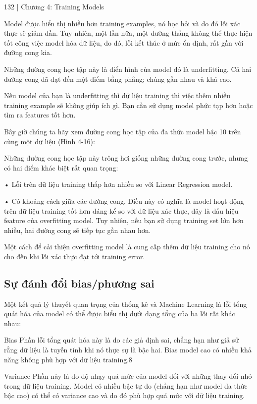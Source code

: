 132 | Chương 4: Training Models

Model được hiển thị nhiều hơn training examples, nó học hỏi và do đó lỗi xác thực sẽ giảm dần. Tuy nhiên, một lần nữa, một đường thẳng không thể thực hiện tốt công việc model hóa dữ liệu, do đó, lỗi kết thúc ở mức ổn định, rất gần với đường cong kia.

Những đường cong học tập này là điển hình của model đó là underfitting. Cả hai đường cong đã đạt đến một điểm bằng phẳng; chúng gần nhau và khá cao.

Nếu model của bạn là underfitting thì dữ liệu training thì việc thêm nhiều training example sẽ không giúp ích gì. Bạn cần sử dụng model phức tạp hơn hoặc tìm ra features tốt hơn.

Bây giờ chúng ta hãy xem đường cong học tập của đa thức model bậc 10 trên cùng một dữ liệu (Hình 4-16):

Những đường cong học tập này trông hơi giống những đường cong trước, nhưng có hai điểm khác biệt rất quan trọng:

• Lỗi trên dữ liệu training thấp hơn nhiều so với Linear Regression model.

• Có khoảng cách giữa các đường cong. Điều này có nghĩa là model hoạt động trên dữ liệu training tốt hơn đáng kể so với dữ liệu xác thực, đây là dấu hiệu feature của overfitting model. Tuy nhiên, nếu bạn sử dụng training set lớn hơn nhiều, hai đường cong sẽ tiếp tục gần nhau hơn.

Một cách để cải thiện overfitting model là cung cấp thêm dữ liệu training cho nó cho đến khi lỗi xác thực đạt tới training error.

\subsection{Sự đánh đổi bias/phương sai}

Một kết quả lý thuyết quan trọng của thống kê và Machine Learning là lỗi tổng quát hóa của model có thể được biểu thị dưới dạng tổng của ba lỗi rất khác nhau:

Bias Phần lỗi tổng quát hóa này là do các giả định sai, chẳng hạn như giả sử rằng dữ liệu là tuyến tính khi nó thực sự là bậc hai. Bias model cao có nhiều khả năng không phù hợp với dữ liệu training.8

Variance Phần này là do độ nhạy quá mức của model đối với những thay đổi nhỏ trong dữ liệu training. Model có nhiều bậc tự do (chẳng hạn như model đa thức bậc cao) có thể có variance cao và do đó phù hợp quá mức với dữ liệu training.

